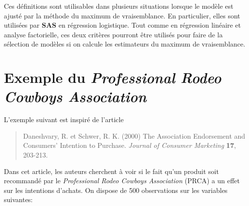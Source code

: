 \documentclass[
  11pt,
  letterpaper,
]{book}
\theoremstyle{definition}
\theoremstyle{definition}
\theoremstyle{definition}
\theoremstyle{remark}
\begin{document}
Ces définitions sont utilisables dans plusieurs situations lorsque le modèle est ajusté par la méthode du maximum de vraisemblance. En particulier, elles sont utilisées par \textbf{SAS} en régression logistique. Tout comme en régression linéaire et analyse factorielle, ces deux critères pourront être utilisés pour faire de la sélection de modèles si on calcule les estimateurs du maximum de vraisemblance.

\hypertarget{cowboy}{%
\section{\texorpdfstring{Exemple du \emph{Professional Rodeo Cowboys Association}}{Exemple du Professional Rodeo Cowboys Association}}\label{cowboy}}

L'exemple suivant est inspiré de l'article

\begin{quote}
Daneshvary, R. et Schwer, R. K. (2000) The Association Endorsement and Consumers' Intention to Purchase. \emph{Journal of Consumer Marketing} \textbf{17}, 203-213.
\end{quote}

Dans cet article, les auteurs cherchent à voir si le fait qu'un produit soit recommandé par le \emph{Professional Rodeo Cowboys Association} (PRCA) a un effet sur les intentions d'achats. On dispose de 500 observations sur les variables suivantes:
\end{document}
